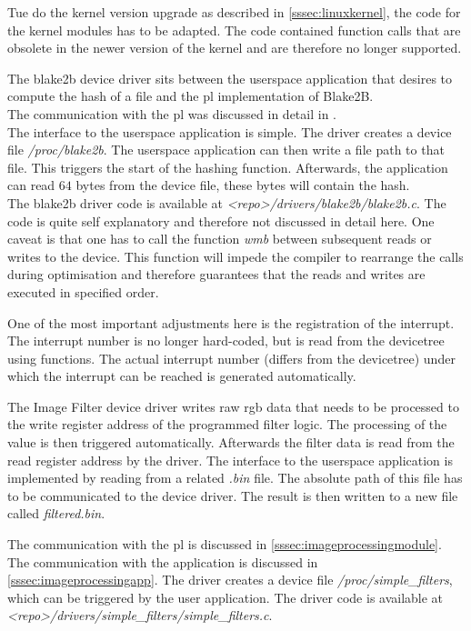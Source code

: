Tue do the kernel version upgrade as described in \cref{sssec:linuxkernel}, the code for the kernel modules has to be adapted. The code contained function calls that are obsolete in the newer version of the kernel and are therefore no longer supported.

The blake2b device driver sits between the userspace application that desires to
compute the hash of a file and the \gls{pl} implementation of Blake2B.\\
The communication with the \gls{pl} was discussed in detail in
.\\
The interface to the userspace application is simple.
The driver creates a device file \emph{/proc/blake2b}.
The userspace application can then write a file path to that file.
This triggers the start of the hashing function.
Afterwards, the application can read $64$ bytes from the device file, these
bytes will contain the hash.\\
The blake2b driver code is available at \emph{<repo>/drivers/blake2b/blake2b.c}.
The code is quite self explanatory and therefore not discussed in detail here.
One caveat is that one has to call the function \emph{wmb} between subsequent
reads or writes to the device.
This function will impede the compiler to rearrange the calls during
optimisation and therefore guarantees that the reads and writes are executed in
specified order.

One of the most important adjustments here is the registration of the interrupt. The interrupt number is no longer hard-coded, but is read from the devicetree using functions. The actual interrupt number (differs from the devicetree) under which the interrupt can be reached is generated automatically.

The Image Filter device driver writes raw \gls{rgb} data that needs to be
processed to the write register address of the programmed filter logic.
The processing of the value is then triggered automatically.
Afterwards the filter data is read from the read register address by the driver.
The interface to the userspace application is implemented by reading from a related \emph{.bin} file. The absolute path of this file has to be communicated to the device driver. The result is then written to a new file called \emph{filtered.bin}.

The communication with the \gls{pl} is discussed in \cref{sssec:imageprocessingmodule}.
The communication with the application is discussed in \cref{sssec:imageprocessingapp}.
The driver creates a device file \emph{/proc/simple\_filters}, which can be triggered by the user application.
The driver code is available at \emph{<repo>/drivers/simple\_filters/simple\_filters.c}.
